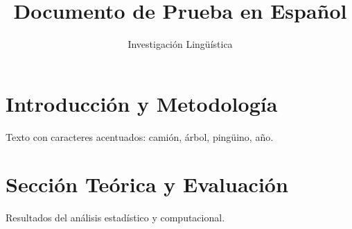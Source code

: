 \documentclass{article}
\begin{document}
\title{Documento de Prueba en Español}
\author{Investigación Lingüística}
\maketitle
\tableofcontents
\section{Introducción y Metodología}
Texto con caracteres acentuados: camión, árbol, pingüino, año.
\section{Sección Teórica y Evaluación}
Resultados del análisis estadístico y computacional.
\end{document}
